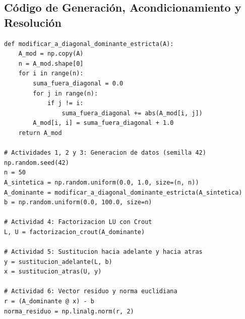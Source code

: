 \documentclass[11pt,a4paper]{article}
\begin{document}
\subsection{Código de Generación, Acondicionamiento y Resolución}
\begin{lstlisting}
def modificar_a_diagonal_dominante_estricta(A):
    A_mod = np.copy(A)
    n = A_mod.shape[0]
    for i in range(n):
        suma_fuera_diagonal = 0.0
        for j in range(n):
            if j != i:
                suma_fuera_diagonal += abs(A_mod[i, j])
        A_mod[i, i] = suma_fuera_diagonal + 1.0
    return A_mod

# Actividades 1, 2 y 3: Generacion de datos (semilla 42)
np.random.seed(42)
n = 50
A_sintetica = np.random.uniform(0.0, 1.0, size=(n, n))
A_dominante = modificar_a_diagonal_dominante_estricta(A_sintetica)
b = np.random.uniform(0.0, 100.0, size=n)

# Actividad 4: Factorizacion LU con Crout
L, U = factorizacion_crout(A_dominante)

# Actividad 5: Sustitucion hacia adelante y hacia atras
y = sustitucion_adelante(L, b)
x = sustitucion_atras(U, y)

# Actividad 6: Vector residuo y norma euclidiana
r = (A_dominante @ x) - b
norma_residuo = np.linalg.norm(r, 2)
\end{lstlisting}
\end{document}
